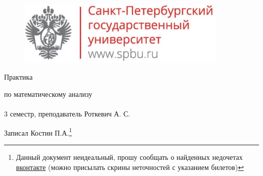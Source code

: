 \documentclass[12pt, fleqn]{article}
\begin{document}
  \begin{figure}[H]
      \includegraphics[width=10cm]{../../../template/spsu.jpg}
      \centering
  \end{figure}
  \vspace*{\fill}
  \begin{center}
    \huge Практика

    \huge по математическому анализу\\ \ \\
    \Large 3 семестр, преподаватель Роткевич А. С.

    \large Записал Костин П.А.\footnote{Данный документ неидеальный, прошу сообщать о найденных недочетах \href{https://vk.com/drab_existence_a}{вконтакте} (можно присылать скрины неточностей с указанием билетов)}
  \end{center}
  \vspace*{\fill}
  \vspace*{\fill}

  \newpage
  \tableofcontents
  \newpage

  
	
	
	
	
	
  
	
	
  
	
	
  
	
	
  
\end{document}
